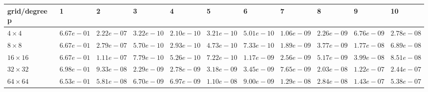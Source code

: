 \begin{tabular}{lllllllllll}
\hline
 grid/degree p   & 1          & 2          & 3          & 4          & 5          & 6          & 7          & 8          & 9          & 10         \\
\hline
 $4 \times 4$    & $6.67e-01$ & $2.22e-07$ & $3.22e-10$ & $2.10e-10$ & $3.21e-10$ & $5.01e-10$ & $1.06e-09$ & $2.26e-09$ & $6.76e-09$ & $2.78e-08$ \\
 $8 \times 8$    & $6.67e-01$ & $2.79e-07$ & $5.70e-10$ & $2.93e-10$ & $4.73e-10$ & $7.33e-10$ & $1.89e-09$ & $3.77e-09$ & $1.77e-08$ & $6.89e-08$ \\
 $16 \times 16$  & $6.67e-01$ & $1.11e-07$ & $7.79e-10$ & $5.26e-10$ & $7.22e-10$ & $1.17e-09$ & $2.56e-09$ & $5.17e-09$ & $3.99e-08$ & $8.51e-08$ \\
 $32 \times 32$  & $6.98e-01$ & $9.33e-08$ & $2.29e-09$ & $2.78e-09$ & $3.18e-09$ & $3.45e-09$ & $7.65e-09$ & $2.03e-08$ & $1.22e-07$ & $2.44e-07$ \\
 $64 \times 64$  & $6.53e-01$ & $5.81e-08$ & $6.70e-09$ & $6.97e-09$ & $1.10e-08$ & $9.00e-09$ & $1.29e-08$ & $2.84e-08$ & $1.43e-07$ & $5.38e-07$ \\
\hline
\end{tabular}